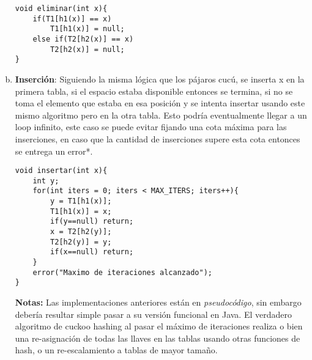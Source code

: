 \documentclass[dcc,sol]{fcfmcourse}
\begin{document}
\begin{problems}
\begin{enumerate}[a)]
\begin{lstlisting}
void eliminar(int x){
    if(T1[h1(x)] == x)
        T1[h1(x)] = null;
    else if(T2[h2(x)] == x)
        T2[h2(x)] = null;
}
\end{lstlisting}

\item \textbf{Inserción}: Siguiendo la misma lógica que los pájaros cucú, se inserta x en la primera tabla, si el espacio estaba disponible entonces se termina, si no se toma el elemento que estaba en esa posición y se intenta insertar usando este mismo algoritmo pero en la otra tabla. Esto podría eventualmente llegar a un loop infinito, este caso se puede evitar fijando una cota máxima para las inserciones, en caso que la cantidad de inserciones supere esta cota entonces se entrega un error*.

\begin{lstlisting}
void insertar(int x){
    int y;
    for(int iters = 0; iters < MAX_ITERS; iters++){
        y = T1[h1(x)];
        T1[h1(x)] = x;
        if(y==null) return;
        x = T2[h2(y)];
        T2[h2(y)] = y;
        if(x==null) return;
    }
    error("Maximo de iteraciones alcanzado");
}
\end{lstlisting}


\textbf{Notas:} Las implementaciones anteriores están en \textit{pseudocódigo}, sin embargo debería resultar simple pasar a su versión funcional en Java. El verdadero algoritmo de cuckoo hashing al pasar el máximo de iteraciones realiza o bien una re-asignación de todas las llaves en las tablas usando otras funciones de hash, o un re-escalamiento a tablas de mayor tamaño.

\end{enumerate}


\end{problems}
\end{document}
